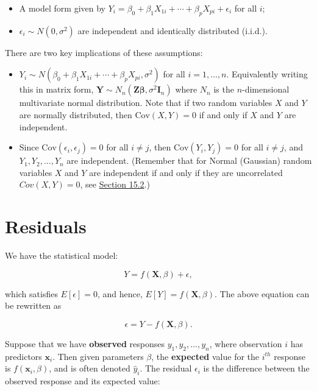 \documentclass[
]{book}
\providecommand{\tightlist}{%
  \setlength{\itemsep}{0pt}\setlength{\parskip}{0pt}}
\begin{document}
\begin{itemize}
\tightlist
\item
  A model form given by \(Y_i = \beta_0 + \beta_1 X_{1i} + \cdots + \beta_p X_{pi} + \epsilon_i\) for all \(i\);\\
\item
  \(\epsilon_i \sim N(0,\sigma^2)\) are independent and identically distributed (i.i.d.).\\
\end{itemize}

There are two key implications of these assumptions:

\begin{itemize}
\tightlist
\item
  \(Y_i \sim N(\beta_0 + \beta_1 X_{1i} + \cdots + \beta_p X_{pi},\sigma^2)\) for all \(i=1,\dots,n\). Equivalently writing this in matrix form, \(\mathbf{Y} \sim N_n \left( \mathbf{Z} \mathbf{\beta}, \sigma^2 \mathbf{I}_n \right)\) where \(N_n\) is the \(n\)-dimensional multivariate normal distribution. Note that if two random variables \(X\) and \(Y\) are normally distributed, then \(\text{Cov}(X,Y)=0\) if and only if \(X\) and \(Y\) are independent.\\
\item
  Since \(\text{Cov}(\epsilon_i,\epsilon_j)=0\) for all \(i \ne j\), then \(\text{Cov}(Y_i,Y_j)=0\) for all \(i \ne j\), and \(Y_1, Y_2,\dots,Y_n\) are independent. (Remember that for Normal (Gaussian) random variables \(X\) and \(Y\) are independent if and only if they are uncorrelated \(Cov (X,Y) =0\), see \protect\hyperlink{MV_Normal:multi}{Section 15.2}.)
\end{itemize}

\hypertarget{Sec_LinearI:residuals}{%
\section{Residuals}\label{Sec_LinearI:residuals}}

We have the statistical model:

\[ Y = f (\mathbf{X},\beta) + \epsilon, \]

which satisfies \(E[\epsilon] =0\), and hence, \(E[Y]=f(\mathbf{X},\beta)\). The above equation can be rewritten as

\[ \epsilon = Y  - f (\mathbf{X},\beta). \]

Suppose that we have \textbf{observed} responses \(y_1, y_2, \ldots, y_n\), where observation \(i\) has predictors \(\mathbf{x}_i\). Then given parameters \(\beta\), the \textbf{expected} value for the \(i^{th}\) response is \(f (\mathbf{x}_i,\beta)\), and is often denoted \(\hat{y}_i\). The residual \(\epsilon_i\) is the difference between the observed response and its expected value:\\
\end{document}
